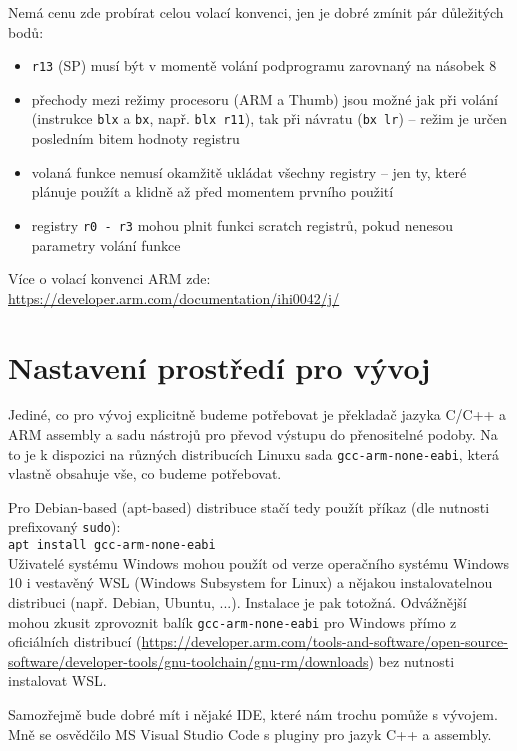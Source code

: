 \documentclass{article}
\begin{document}
Nemá cenu zde probírat celou volací konvenci, jen je dobré zmínit pár důležitých bodů:
\begin{itemize}
	\item \texttt{r13} (SP) musí být v momentě volání podprogramu zarovnaný na násobek 8
	\item přechody mezi režimy procesoru (ARM a Thumb) jsou možné jak při volání (instrukce \texttt{blx} a \texttt{bx}, např. \texttt{blx r11}), tak při návratu (\texttt{bx lr}) -- režim je určen posledním bitem hodnoty registru
	\item volaná funkce nemusí okamžitě ukládat všechny registry -- jen ty, které plánuje použít a klidně až před momentem prvního použití
	\item registry \texttt{r0 - r3} mohou plnit funkci scratch registrů, pokud nenesou parametry volání funkce
\end{itemize}

Více o volací konvenci ARM zde: \url{https://developer.arm.com/documentation/ihi0042/j/}

\section{Nastavení prostředí pro vývoj}

Jediné, co pro vývoj explicitně budeme potřebovat je překladač jazyka C/C++ a ARM assembly a sadu nástrojů pro převod výstupu do přenositelné podoby. Na to je k dispozici na různých distribucích Linuxu sada \texttt{gcc-arm-none-eabi}, která vlastně obsahuje vše, co budeme potřebovat.

Pro Debian-based (apt-based) distribuce stačí tedy použít příkaz (dle nutnosti prefixovaný \texttt{sudo}):\\

\texttt{apt install gcc-arm-none-eabi}\\

Uživatelé systému Windows mohou použít od verze operačního systému Windows 10 i vestavěný WSL (Windows Subsystem for Linux) a nějakou instalovatelnou distribuci (např. Debian, Ubuntu, ...). Instalace je pak totožná. Odvážnější mohou zkusit zprovoznit balík \texttt{gcc-arm-none-eabi} pro Windows přímo z oficiálních distribucí (\url{https://developer.arm.com/tools-and-software/open-source-software/developer-tools/gnu-toolchain/gnu-rm/downloads}) bez nutnosti instalovat WSL.

Samozřejmě bude dobré mít i nějaké IDE, které nám trochu pomůže s vývojem. Mně se osvědčilo MS Visual Studio Code s pluginy pro jazyk C++ a assembly.
\end{document}
